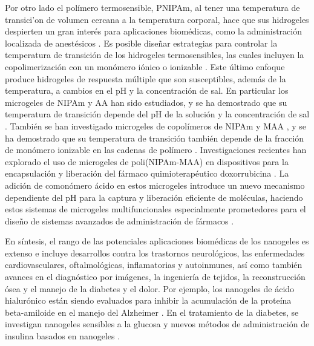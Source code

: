 
Por otro lado el pol\'imero termosensible, PNIPAm, al tener una temperatura de transici'on de volumen cercana a la temperatura corporal, hace que sus hidrogeles despierten un gran inter\'es para aplicaciones biom\'edicas, como la administraci\'on localizada de anest\'esicos \cite{Guan2011, indulekha2016thermoresponsive}. %
Es posible dise\~nar estrategias para controlar la temperatura de transici\'on de los hidrogeles termosensibles, las cuales incluyen la copolimerizaci\'on con un mon\'omero i\'onico o ionizable \cite{Cai2007,Macchione2019, Hirose1987,Lopez2020}.
Este \'ultimo enfoque produce hidrogeles de respuesta m\'ultiple que son susceptibles, adem\'as de la temperatura, a cambios en el pH y la concentraci\'on de sal.
En particular los microgeles de NIPAm y AA han sido estudiados, y se ha demostrado que su temperatura de transici\'on depende del pH de la soluci\'on y la concentraci\'on de sal \cite{Morris1997, Jones2000,Bradley2005,Begum2016}.
Tambi\'en se han investigado microgeles de copol\'imeros de NIPAm y MAA \cite{Dowding2000,Hoare2004,Giussi2015}, y se ha demostrado que su temperatura de transici\'on tambi\'en depende de la fracci\'on de mon\'omero ionizable en las cadenas de pol\'imero \cite{Morris1997,Jones2000, Hoare2004, Bradley2005, Lee2008,Wong2009,Hamzavi2016}.
Investigaciones recientes han explorado el uso de microgeles de poli(NIPAm-MAA) en dispositivos para la encapsulaci\'on y liberaci\'on del f\'armaco quimioterap\'eutico doxorrubicina \cite{Giussi2020, MartinezMoro2020, Pergushov2020}. La adici\'on de comon\'omero \'acido en estos microgeles introduce un nuevo mecanismo dependiente del pH para la captura y liberaci\'on eficiente de mol\'eculas, haciendo estos sistemas de microgeles multifuncionales especialmente prometedores para el dise\~no de sistemas avanzados de administraci\'on de f\'armacos \cite{Liu2017}.

En s\'intesis, el rango de las potenciales aplicaciones biom\'edicas de los nanogeles es extenso e incluye desarrollos contra los trastornos neurol\'ogicos, las enfermedades cardiovasculares, oftalmol\'ogicas, inflamatorias y autoinmunes, as\'i como tambi\'en avances en el diagn\'ostico por im\'agenes, la ingenier\'ia de tejidos, la reconstrucci\'on \'osea y el manejo de la diabetes y el dolor. Por ejemplo, los nanogeles de \'acido hialur\'onico est\'an siendo evaluados para inhibir la acumulaci\'on de la prote\'ina beta-amiloide en el manejo del Alzheimer \cite{jiang2018nanogels}. En el tratamiento de la diabetes, se investigan nanogeles sensibles a la glucosa \cite{wu2010multifunctional} y nuevos m\'etodos de administraci\'on de insulina basados en nanogeles \cite{nolan2004thermally}.

